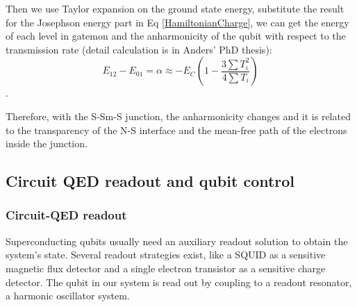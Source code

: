 Then we use Taylor expansion on the ground state energy, substitute the result for the Josephson energy part in Eq \ref{HamiltonianCharge}, we can get the energy of each level in gatemon and the anharmonicity of the qubit with respect to the transmission rate (detail calculation is in Anders' PhD thesis\cite{RN79}):
\begin{equation}
    E_{12} - E_{01} = \alpha \approx -E_C \left(1-\frac{3\sum T_i^2}{4\sum T_i}\right)
\end{equation}.

Therefore, with the S-Sm-S junction, the anharmonicity changes and it is related to the transparency of the N-S interface and the mean-free path of the electrons inside the junction.  

\subsection{Circuit QED readout and qubit control}
\subsubsection{Circuit-QED readout}
Superconducting qubits usually need an auxiliary readout solution to obtain the system's state. Several readout strategies exist, like a SQUID as a sensitive magnetic flux detector and a single electron transistor as a sensitive charge detector. The qubit in our system is read out by coupling to a readout resonator, a harmonic oscillator system.

